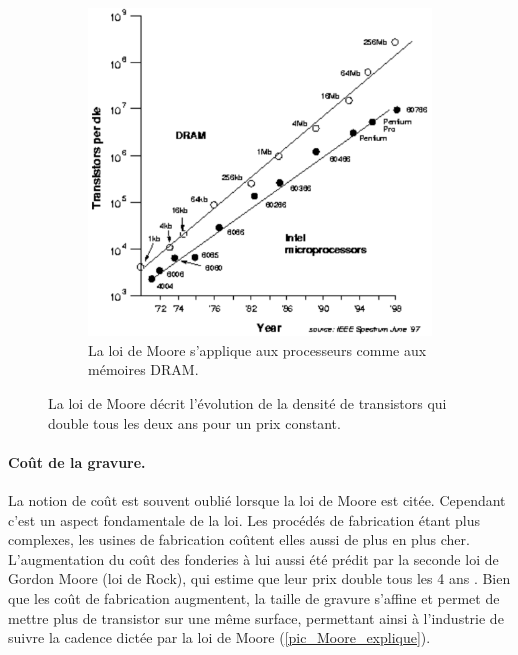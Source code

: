 \begin{figure}
\begin{subfigure}[]{0.48\linewidth}
        \includegraphics[width=0.9\linewidth]{images/processeurs_porte_moore_dram.png}
        \caption{La loi de Moore s'applique aux processeurs comme aux mémoires DRAM.}
        \label{processeurs_porte_moore_dram}
    \end{subfigure}
    \caption{La loi de Moore décrit l'évolution de la densité de transistors qui double tous les deux ans pour un prix constant.}
    \label{fig_processeurs_moore}
\end{figure}





\paragraph{Coût de la gravure.}

La notion de coût est souvent oublié lorsque la loi de Moore est citée. Cependant c'est un aspect fondamentale de la loi. Les procédés de fabrication étant plus complexes, les usines de fabrication coûtent elles aussi de plus en plus cher. L'augmentation du coût des fonderies à lui aussi été prédit par la seconde loi de Gordon Moore (loi de Rock), qui estime que leur prix double tous les 4 ans \cite{schaller1997moore}. Bien que les coût de fabrication augmentent, la taille de gravure s'affine et permet de mettre plus de transistor sur une même surface, permettant ainsi à l'industrie de suivre la cadence dictée par la loi de Moore (\autoref{pic_Moore_explique}).

